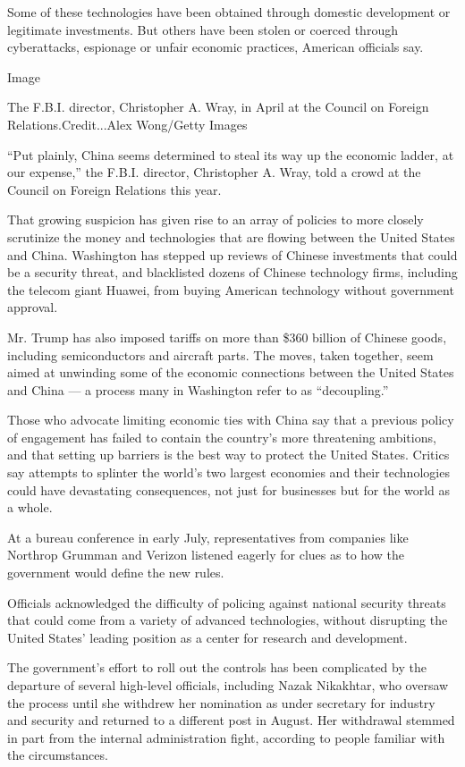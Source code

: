 Some of these technologies have been obtained through domestic
development or legitimate investments. But others have been stolen or
coerced through cyberattacks, espionage or unfair economic practices,
American officials say.

Image

The F.B.I. director, Christopher A. Wray, in April at the Council on
Foreign Relations.Credit...Alex Wong/Getty Images

``Put plainly, China seems determined to steal its way up the economic
ladder, at our expense,'' the F.B.I. director, Christopher A. Wray, told
a crowd at the Council on Foreign Relations this year.

That growing suspicion has given rise to an array of policies to more
closely scrutinize the money and technologies that are flowing between
the United States and China. Washington has stepped up reviews of
Chinese investments that could be a security threat, and blacklisted
dozens of Chinese technology firms, including the telecom giant Huawei,
from buying American technology without government approval.

Mr. Trump has also imposed tariffs on more than \$360 billion of Chinese
goods, including semiconductors and aircraft parts. The moves, taken
together, seem aimed at unwinding some of the economic connections
between the United States and China --- a process many in Washington
refer to as ``decoupling.''

Those who advocate limiting economic ties with China say that a previous
policy of engagement has failed to contain the country's more
threatening ambitions, and that setting up barriers is the best way to
protect the United States. Critics say attempts to splinter the world's
two largest economies and their technologies could have devastating
consequences, not just for businesses but for the world as a whole.

At a bureau conference in early July, representatives from companies
like Northrop Grumman and Verizon listened eagerly for clues as to how
the government would define the new rules.

Officials acknowledged the difficulty of policing against national
security threats that could come from a variety of advanced
technologies, without disrupting the United States' leading position as
a center for research and development.

The government's effort to roll out the controls has been complicated by
the departure of several high-level officials, including Nazak
Nikakhtar, who oversaw the process until she withdrew her nomination as
under secretary for industry and security and returned to a different
post in August. Her withdrawal stemmed in part from the internal
administration fight, according to people familiar with the
circumstances.

